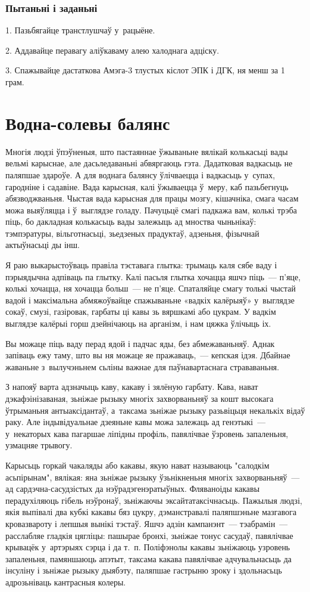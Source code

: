 \subsubsection{Пытаньні і заданьні}

1. Пазьбягайце транстлушчаў у~рацыёне.

2. Аддавайце перавагу аліўкаваму алею халоднага адціску.

3. Спажывайце дастаткова Амэга-3 тлустых кіслот ЭПК і ДГК, ня менш за 1 грам.


\section{Водна-солевы балянс}

Многія людзі ўпэўненыя, што пастаяннае ўжываньне вялікай колькасьці вады вельмі карыснае, але дасьледаваньні абвяргаюць гэта. Дадатковая вадкасьць не паляпшае здароўе. А для воднага балянсу ўлічваецца і вадкасьць у~супах, гародніне і садавіне. Вада карысная, калі ўжываецца ў~меру, каб пазьбегнуць абязводжваньня. Чыстая вада карысная для працы мозгу, кішачніка, смага часам можа выяўляцца і ў~выглядзе голаду. Пачуцьцё смагі падкажа вам, колькі трэба піць, бо дакладная колькасьць вады залежыць ад мноства чыньнікаў: тэмпэратуры, вільготнасьці, зьедзеных прадуктаў, адзеньня, фізычнай актыўнасьці ды інш.

Я раю выкарыстоўваць правіла тэставага глытка: трымаць каля сябе ваду і пэрыядычна адпіваць па глытку. Калі пасьля глытка хочацца яшчэ піць~--- п'яце, колькі хочацца, ня хочацца больш~--- не п'яце. Спаталяйце смагу толькі чыстай вадой і максімальна абмяжоўвайце спажываньне «вадкіх калёрыяў» у~выглядзе сокаў, смузі, газіровак, гарбаты ці кавы зь вяршкамі або цукрам. У вадкім выглядзе калёрыі горш дзейнічаюць на арганізм, і нам цяжка ўлічыць іх.

Вы можаце піць ваду перад ядой і падчас яды, без абмежаваньняў. Аднак запіваць ежу таму, што вы ня можаце яе пражаваць,~--- кепская ідэя. Дбайнае жаваньне з~вылучэньнем сьліны важнае для паўнавартаснага страваваньня.

З напояў варта адзначыць каву, какаву і зялёную гарбату. Кава, нават дэкафэінізаваная, зьніжае рызыку многіх захворваньняў за кошт высокага ўтрыманьня антыаксідантаў, а~таксама зьніжае рызыку разьвіцьця некалькіх відаў раку. Але індывідуальнае дзеяньне кавы можа залежаць ад генэтыкі~--- у~некаторых кава пагаршае ліпідны профіль, павялічвае ўзровень запаленьня, узмацняе трывогу.

Карысьць горкай чакаляды або какавы, якую нават называюць "салодкім асьпірынам", вялікая: яна зьніжае рызыку ўзьнікненьня многіх захворваньняў~--- ад сардэчна-сасудзістых да нэўрадэгенэратыўных. Фляваноіды какавы перадухіляюць гібель нэўронаў, зьніжаючы эксайтатаксічнасьць. Пажылыя людзі, якія выпівалі два кубкі какавы бяз цукру, дэманстравалі паляпшэньне мазгавога кровазвароту і лепшыя вынікі тэстаў. Яшчэ адзін кампанэнт~--- тэабрамін~--- расслабляе гладкія цягліцы: пашырае бронхі, зьніжае тонус сасудаў, павялічвае крывацёк у~артэрыях сэрца і да т.~п. Поліфэнолы какавы зьніжаюць узровень запаленьня, памяншаюць апэтыт, таксама какава павялічвае адчувальнасьць да інсуліну і зьніжае рызыку дыябэту, паляпшае гастрыню зроку і здольнасьць адрозьніваць кантрасныя колеры.


